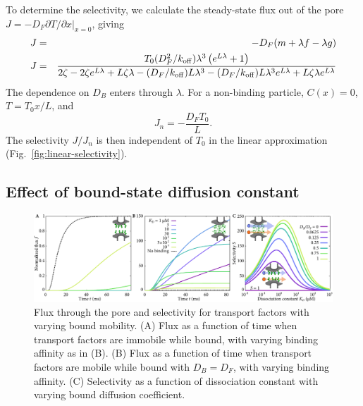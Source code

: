 To determine the selectivity, we calculate the steady-state flux out
of the pore\\ $ J =- D_F \partial T/\partial x|_{x=0}$, giving
\begin{eqnarray}
J& =&-D_F( m + \lambda f - \lambda g) \\
J&=& \frac{{T_0 (D_F^2/k_{\rm off}) { \lambda}^3 \left(e^{L  \lambda}
     + 1\right)}}{2 \zeta - 2 \zeta e^{L  \lambda} + L \zeta
     \lambda - (D_F/k_{\rm off}) L  \lambda^3 - (D_F/k_{\rm off}) L  \lambda^3
     e^{L  \lambda} + L \zeta  \lambda e^{L  \lambda}} 
\end{eqnarray}
The dependence on $D_B$ enters through $\lambda$. For a non-binding particle, $C(x) = 0$, $T = T_0 x / L$, and
\begin{equation}
  J_n =-\frac{D_F T_0}{L}. 
\end{equation}
The selectivity $J/J_n$ is then independent of $T_0$ in
the linear approximation (Fig.~\ref{fig:linear-selectivity}).

\subsection{Effect of bound-state diffusion constant}

\begin{figure}[t!]
\centering
\includegraphics[width=\textwidth]{figs/ch02/fig2.pdf}
\caption[Flux and selectivity as a function of bound mobility.]{Flux through the pore and selectivity for transport factors with varying
  bound mobility. (A) Flux as a function of time when transport factors are immobile
  while bound, with varying binding affinity as in (B).  (B) Flux as a function
  of time when transport factors are mobile while bound with $D_B = D_F$, with
  varying binding affinity.  (C) Selectivity as a function of
  dissociation constant with varying bound diffusion coefficient. }
\label{fig:transient}
\end{figure}

